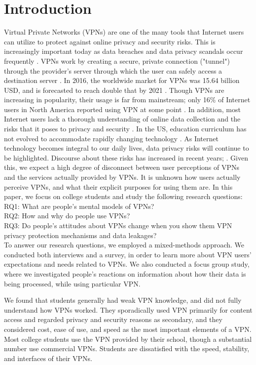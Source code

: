 \section{Introduction}

Virtual Private Networks (VPNs) are one of the many tools that Internet users can utilize to
protect against online privacy and security risks. This is increasingly important today as data breaches and data privacy scandals occur frequently \cite{brandom_4, grothaus_21, meyer_22, reilly_23, perlroth_24}. VPNs work by creating a
secure, private connection ("tunnel") through the provider's server through
which the user can safely access a destination server \cite{vaughan-nichols_25}.   In 2016, the
worldwide market for VPNs was 15.64 billion USD, and is forecasted to reach
double that by 2021 \cite{vpnmarket_3}. Though VPNs are
increasing in popularity, their usage is far from mainstream; only 16\% of
Internet users in North America reported using VPN at some point \cite{mander_27}. In
addition, most Internet users lack a thorough understanding of online data
collection and the risks that it poses to privacy and security \cite{shirazi_9}. In the US,
education curriculum has not evolved to accommodate rapidly changing
technology \cite{levin_29}. As Internet technology becomes integral to our daily lives, data privacy risks
will continue to be highlighted. Discourse about these risks has increased in
recent years; . Given this, we expect a high degree of disconnect between
user perceptions of VPNs and the services actually provided by VPNs. It is
unknown how users actually perceive VPNs, and what their explicit purposes for
using them are. In this paper, we focus on college students and study the
following research questions:\\
RQ1: What are people’s mental models of VPNs?\\
RQ2: How and why do people use VPNs?\\
RQ3: Do people’s attitudes about VPNs change when you show them VPN privacy protection mechanisms and data leakages?\\

To answer our research questions, we employed a mixed-methods approach. We conducted both interviews and a survey, in order to learn more about VPN users' expectations and needs related to VPNs. We also conducted a focus group study, where we investigated people's reactions on information about how their data is being processed, while using particular VPN.

We found that students generally had weak VPN knowledge, and did not fully
understand how VPNs worked. They sporadically used VPN primarily for content
access and regarded privacy and security reasons as secondary, and they
considered cost, ease of use, and speed as the most important elements of a
VPN. Most college students use the VPN provided by their school, though a
substantial number use commercial VPNs. Students are dissatisfied with the
speed, stability, and interfaces of their VPNs.

